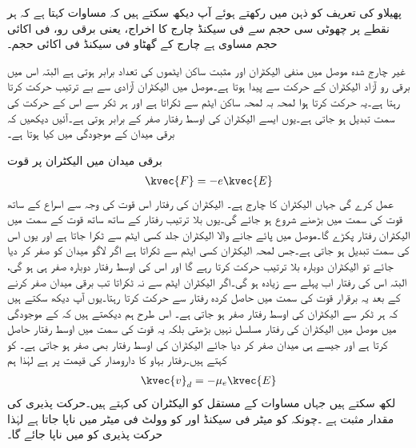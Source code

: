 پھیلاو کی تعریف کو ذہن میں رکھتے ہوئے آپ دیکھ سکتے ہیں کہ مساوات  کہتا ہے کہ ہر نقطے پر چھوٹی سی حجم سے فی سیکنڈ چارج کا اخراج، یعنی برقی رو، فی اکائی حجم مساوی ہے چارج کے گھٹاو فی سیکنڈ فی اکائی حجم۔ 


غیر چارج شدہ موصل میں منفی الیکٹران اور مثبت ساکن ایٹموں کی تعداد برابر ہوتی ہے البتہ اس میں برقی رو آزاد الیکٹران کے حرکت سے پیدا ہوتا ہے۔موصل میں الیکٹران آزادی سے بے ترتیب حرکت کرتا رہتا ہے۔یہ حرکت کرتا ہوا لمحہ بہ لمحہ ساکن ایٹم سے ٹکراتا ہے اور ہر ٹکر سے اس کے حرکت کی سمت تبدیل ہو جاتی ہے۔یوں ایسے الیکٹران کی اوسط رفتار صفر کے برابر ہوتی ہے۔آئیں دیکھیں کہ برقی میدان کے موجودگی میں کیا ہوتا ہے۔

برقی میدان  میں الیکٹران پر قوت
\begin{align}
\kvec{F}=-e\kvec{E}
\end{align}
عمل کرے گی جہاں الیکٹران کا چارج  ہے۔ الیکٹران کی رفتار اس قوت کی وجہ سے  اسراع کے ساتھ قوت کی سمت میں بڑھنے شروع ہو جائے گی۔یوں بلا ترتیب رفتار  کے ساتھ ساتھ قوت کے سمت میں الیکٹران رفتار پکڑے گا۔موصل میں پائے جانے والا الیکٹران جلد کسی ایٹم سے ٹکرا جاتا ہے اور یوں اس کی سمت تبدیل ہو جاتی ہے۔جس لمحہ  الیکٹران کسی ایٹم سے ٹکراتا ہے اگر لاگو میدان کو صفر کر دیا جائے تو الیکٹران دوبارہ بلا ترتیب حرکت کرتا رہے گا اور اس کی اوسط رفتار دوبارہ صفر ہی ہو گی،  البتہ اس کی رفتار اب پہلے سے زیادہ ہو گی۔اگر الیکٹران ایٹم سے نہ ٹکراتا تب برقی میدان صفر کرنے کے بعد یہ برقرار قوت کی سمت میں حاصل کردہ رفتار سے حرکت کرتا رہتا۔یوں آپ دیکھ سکتے ہیں کہ ہر ٹکر سے الیکٹران کی اوسط رفتار صفر ہو جاتی ہے۔
اس طرح ہم دیکھتے ہیں کہ   کے موجودگی میں موصل میں الیکٹران کی رفتار مسلسل نہیں بڑھتی بلکہ یہ قوت کی سمت میں اوسط رفتار  حاصل کرتا ہے اور جیسے ہی میدان صفر کر دیا جائے الیکٹران کی اوسط رفتار بھی صفر ہو جاتی ہے۔ کو  کہتے ہیں۔رفتار بہاو کا دارومدار  کی قیمت پر ہے لہٰذا ہم
\begin{align}\label{مساوات_کپیسٹر_رفتار_بہاو}
\kvec{v}_d=-\mu_e \kvec{E}
\end{align}
لکھ سکتے ہیں جہاں مساوات کے مستقل  کو الیکٹران کی  کہتے ہیں۔حرکت پذیری کی مقدار مثبت ہے ۔چونکہ  کو میٹر فی سیکنڈ اور  کو وولٹ فی میٹر میں ناپا جاتا ہے لہٰذا حرکت پذیری کو  میں ناپا جائے گا۔

